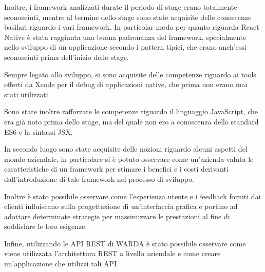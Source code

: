 Inoltre, i framework analizzati durate il periodo di stage erano totalmente sconosciuti, mentre al termine dello stage sono state acquisite delle conoscenze basilari riguardo i vari framework.
In particolar modo per quanto riguarda React Native è stata raggiunta una buona padronanza del framework, specialmente nello sviluppo di un applicazione secondo i pattern tipici, che erano anch'essi sconosciuti prima dell'inizio dello stage.

Sempre legato allo sviluppo, si sono acquisite delle competenze riguardo ai tools offerti da Xcode per il debug di applicazioni native, che prima non erano mai stati utilizzati.

Sono state inoltre rafforzate le competenze riguardo il linguaggio JavaScript, che era già noto prima dello stage, ma del quale non ero a conoscenza dello standard ES6 e la sintassi JSX.

In secondo luogo sono state acquisite delle nozioni riguardo alcuni aspetti del mondo aziendale, in particolare si è potuto osservare come un'azienda valuta le caratteristiche di un framework per stimare i benefici e i costi derivanti dall'introduzione di tale framework nel processo di sviluppo.

Inoltre è stato possibile osservare come l'esperienza utente e i feedback forniti dai clienti influiscano sulla progettazione di un'interfaccia grafica e portino ad adottare determinate strategie per massimizzare le prestazioni al fine di soddisfare le loro esigenze.

Infine, utilizzando le API REST di WARDA è stato possibile osservare come viene utilizzata l'architettura REST a livello aziendale e come creare un'applicazione che utilizzi tali API.

